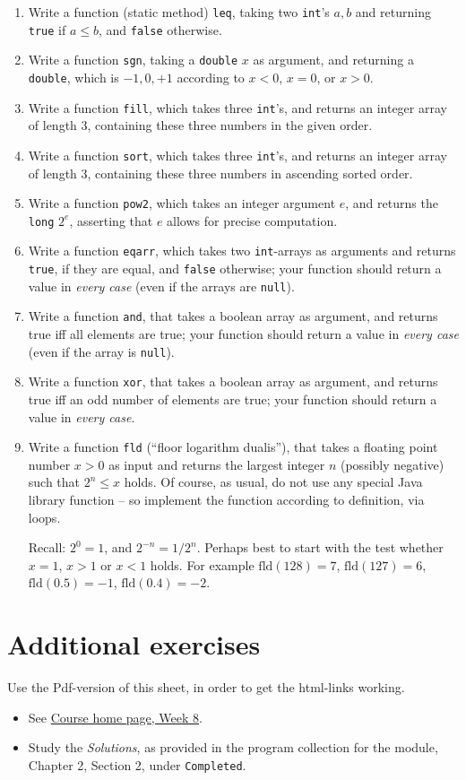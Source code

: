 \documentclass[11pt]{article}
\begin{document}
\begin{enumerate}
\item Write a function (static method) \texttt{leq}, taking two \texttt{int}'s $a, b$ and returning \texttt{true} if $a \le b$, and \texttt{false} otherwise.
\item Write a function \texttt{sgn}, taking a \texttt{double} $x$ as argument, and returning a \texttt{double}, which is $-1, 0 , +1$ according to $x < 0$, $x = 0$, or $x > 0$.
\item Write a function \texttt{fill}, which takes three \texttt{int}'s, and returns an integer array of length $3$, containing these three numbers in the given order.
\item Write a function \texttt{sort}, which takes three \texttt{int}'s, and returns an integer array of length $3$, containing these three numbers in ascending sorted order.
\item Write a function \texttt{pow2}, which takes an integer argument $e$, and returns the \texttt{long} $2^e$, asserting that $e$ allows for precise computation.
\item Write a function \texttt{eqarr}, which takes two \texttt{int}-arrays as arguments and returns \texttt{true}, if they are equal, and \texttt{false} otherwise; your function should return a value in \emph{every case} (even if the arrays are \texttt{null}).
\item Write a function \texttt{and}, that takes a boolean array as argument, and returns true iff all elements are true; your function should return a value in \emph{every case} (even if the array is \texttt{null}).
\item Write a function \texttt{xor}, that takes a boolean array as argument, and returns true iff an odd number of elements are true; your function should return a value in \emph{every case}.
\item Write a function \texttt{fld} (``floor logarithm dualis''), that takes a floating point number $x > 0$ as input and returns the largest integer $n$ (possibly negative) such that $2^n \le x$ holds. Of course, as usual, do not use any special Java library function -- so implement the function according to definition, via loops.

  Recall: $2^0 = 1$, and $2^{-n} = 1 / 2^n$. Perhaps best to start with the test whether $x = 1$, $x > 1$ or $x < 1$ holds. For example $\mathrm{fld}(128) = 7$, $\mathrm{fld}(127) = 6$, $\mathrm{fld}(0.5) = -1$, $\mathrm{fld}(0.4) = -2$.
\end{enumerate}


\section{Additional exercises}
\label{sec:addex}

Use the Pdf-version of this sheet, in order to get the html-links working.
\begin{itemize}
\item See \href{\chp#ExercisesWeek08}{Course home page, Week 8}.
\item Study the \emph{Solutions}, as provided in the program collection for the module, Chapter 2, Section 2, under \texttt{Completed}.
\end{itemize}
\end{document}

